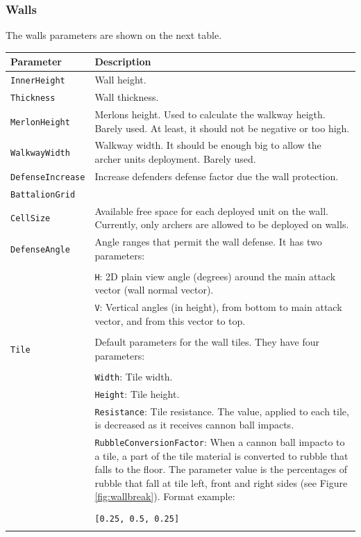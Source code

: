 \documentclass[tog]{acmsiggraph}
\begin{document}
\subsubsection{Walls}
\label{sec:settingscastlewall}

The walls parameters are shown on the next table.

\begin{tabularx}{0.48\textwidth}{ |l|X| }
\hline 
\textbf{Parameter} & \textbf{Description} \\[0.15cm]
 \hline
 \texttt{InnerHeight} & Wall height. \\
 \hline
 \texttt{Thickness} & Wall thickness. \\
 \hline
 \texttt{MerlonHeight} & Merlons height. Used to calculate the walkway heigth. Barely used. At least, it should not be negative or too high. \\
 \hline
 \texttt{WalkwayWidth} & Walkway width. It should be enough big to allow the archer units deployment. Barely used. \\
 \hline
 \texttt{DefenseIncrease} & Increase defenders defense factor due the wall protection. \\
 \hline
 \texttt{BattalionGrid} & \\
 \texttt{CellSize} & Available free space for each deployed unit on the wall. Currently, only archers are allowed to be deployed on walls. \\
 \hline
 \texttt{DefenseAngle} & Angle ranges that permit the wall defense. It has two parameters: \\
 & \\
 & \quad\texttt{H}: 2D plain view angle (degrees) around the main attack vector (wall normal vector). \\
 & \quad\texttt{V}: Vertical angles (in height), from bottom to main attack vector, and from this vector to top. \\
 & \\
 \hline
 \texttt{Tile} & Default parameters for the wall tiles. They have four parameters: \\
 & \\
 & \texttt{Width}: Tile width. \\
 & \texttt{Height}: Tile height. \\
 & \texttt{Resistance}: Tile resistance. The value, applied to each tile, is decreased as it receives cannon ball impacts. \\
 & \texttt{RubbleConversionFactor}: When a cannon ball impacto to a tile, a part of the tile material is converted to rubble that falls to the floor. The parameter value is the percentages of rubble that fall at tile left, front and right sides (see Figure \ref{fig:wallbreak}). Format example: \\
 & \\
 & \quad\texttt{[0.25, 0.5, 0.25]} \\
 & \\
 \hline
\end{tabularx} 
\end{document}
